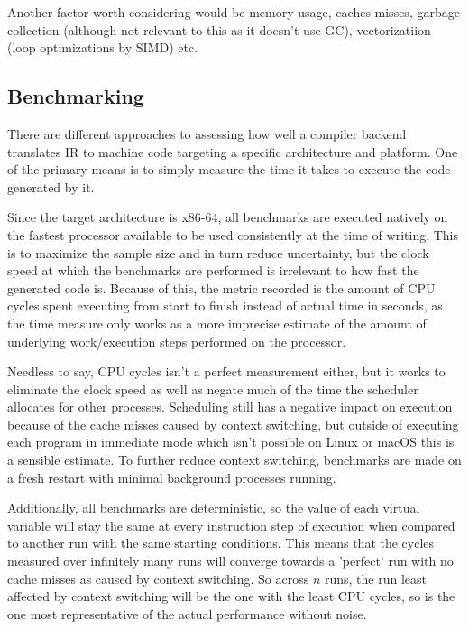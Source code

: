 \documentclass{article}
\begin{document}

Another factor worth considering would be memory usage, caches misses, garbage collection (although not relevant to this as it doesn't use GC), vectorizatiion (loop optimizations by SIMD) etc.

\color{mygreen}
\subsection{Benchmarking}


There are different approaches to assessing how well a compiler backend translates IR to machine code targeting a specific architecture and platform. One of the primary means is to simply measure the time it takes to execute the code generated by it.

Since the target architecture is x86-64, all benchmarks are executed natively on the fastest processor available to be used consistently at the time of writing. This is to maximize the sample size and in turn reduce uncertainty, but the clock speed at which the benchmarks are performed is irrelevant to how fast the generated code is. Because of this, the metric recorded is the amount of CPU cycles spent executing from start to finish instead of actual time in seconds, as the time measure only works as a more imprecise estimate of the amount of underlying work/execution steps performed on the processor.

Needless to say, CPU cycles isn't a perfect measurement either, but it works to eliminate the clock speed as well as negate much of the time the scheduler allocates for other processes. Scheduling still has a negative impact on execution because of the cache misses caused by context switching, but outside of executing each program in immediate mode which isn't possible on Linux or macOS this is a sensible estimate. To further reduce context switching, benchmarks are made on a fresh restart with minimal background processes running.

Additionally, all benchmarks are deterministic, so the value of each virtual variable will stay the same at every instruction step of execution when compared to another run with the same starting conditions. %
This means that the cycles measured over infinitely many runs will converge towards a 'perfect' run with no cache misses as caused by context switching. So across \(n\) runs, the run least affected by context switching will be the one with the least CPU cycles, so is the one most representative of the actual performance without noise.
\end{document}
